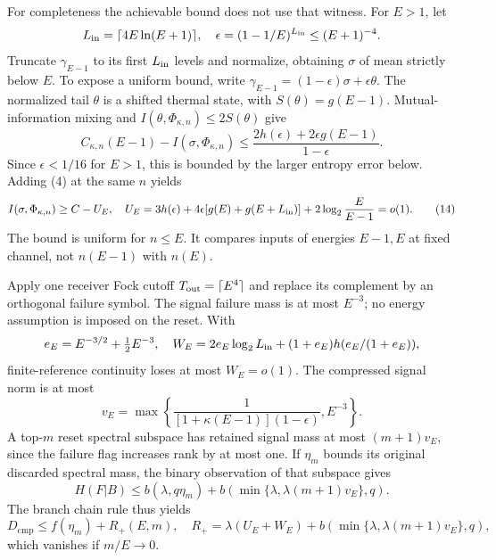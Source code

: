 \documentclass[11pt]{article}
\newcommand{\cmp}{\mathrm{cmp}}
\newcommand{\PhiT}{\Phi_{\kappa,n}}
\begin{document}
For completeness the achievable bound does not use that witness.
For \(E>1\), let
\[
 L_{\rm in}=\lceil4E\ln(E+1)\rceil,\quad
 \epsilon=(1-1/E)^{L_{\rm in}}\le(E+1)^{-4}.
\]
Truncate \(\gamma_{E-1}\) to its first \(L_{\rm in}\) levels and normalize,
obtaining \(\sigma\) of mean strictly below \(E\).
To expose a uniform bound, write
\(\gamma_{E-1}=(1-\epsilon)\sigma+\epsilon\theta\).
The normalized tail \(\theta\) is a shifted thermal state, with
\(S(\theta)=g(E-1)\). Mutual-information mixing and
\(I(\theta,\PhiT)\le2S(\theta)\) give
\[
 C_{\kappa,n}(E-1)-I(\sigma,\PhiT)
 \le\frac{2h(\epsilon)+2\epsilon g(E-1)}{1-\epsilon}.
\]
Since \(\epsilon<1/16\) for \(E>1\), this is bounded by the larger
entropy error below. Adding (4) at the same \(n\) yields
\[
 I(\sigma,\PhiT)\ge C-U_E,\quad
 U_E=3h(\epsilon)+4\epsilon[g(E)+g(E+L_{\rm in})]
                         +2\log_2\frac E{E-1}=o(1).         \tag{14}
\]
The bound is uniform for \(n\le E\). It compares inputs of energies
\(E-1,E\) at fixed channel, not \(n(E-1)\) with \(n(E)\).

Apply one receiver Fock cutoff \(T_{\rm out}=\lceil E^4\rceil\)
and replace its complement by an orthogonal failure symbol.
The signal failure mass is at most \(E^{-3}\); no energy assumption
is imposed on the reset. With
\[
 e_E=E^{-3/2}+\tfrac12E^{-3},\quad
 W_E=2e_E\log_2L_{\rm in}
       +(1+e_E)h(e_E/(1+e_E)),
\]
finite-reference continuity \cite[Lemma~2]{winter} loses at most
\(W_E=o(1)\). The compressed signal norm is at most
\[
 v_E=\max\left\{\frac1{[1+\kappa(E-1)](1-\epsilon)},E^{-3}\right\}.
\]
A top-\(m\) reset spectral subspace has retained signal mass at most
\((m+1)v_E\), since the failure flag increases rank by at most one.
If \(\eta_m\) bounds its original discarded spectral mass, the binary
observation of that subspace gives
\[
 H(F|B)\le b(\lambda,q\eta_m)
       +b(\min\{\lambda,\lambda(m+1)v_E\},q).
\]
The branch chain rule thus yields
\[
 D_{\cmp}\le f(\eta_m)+R_+(E,m),\quad
 R_+=\lambda(U_E+W_E)+
          b(\min\{\lambda,\lambda(m+1)v_E\},q),               \tag{15}
\]
which vanishes if \(m/E\to0\).
\end{document}
